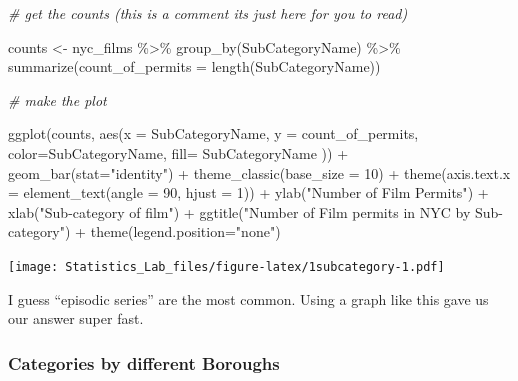 \documentclass[
]{book}
\newenvironment{Shaded}{\begin{snugshade}}{\end{snugshade}}
\newcommand{\AttributeTok}[1]{\textcolor[rgb]{0.77,0.63,0.00}{#1}}
\newcommand{\CommentTok}[1]{\textcolor[rgb]{0.56,0.35,0.01}{\textit{#1}}}
\newcommand{\DecValTok}[1]{\textcolor[rgb]{0.00,0.00,0.81}{#1}}
\newcommand{\FunctionTok}[1]{\textcolor[rgb]{0.00,0.00,0.00}{#1}}
\newcommand{\NormalTok}[1]{#1}
\newcommand{\OtherTok}[1]{\textcolor[rgb]{0.56,0.35,0.01}{#1}}
\newcommand{\SpecialCharTok}[1]{\textcolor[rgb]{0.00,0.00,0.00}{#1}}
\newcommand{\StringTok}[1]{\textcolor[rgb]{0.31,0.60,0.02}{#1}}
\begin{document}
\begin{Shaded}
\begin{Highlighting}[]
\CommentTok{\# get the counts (this is a comment it\textquotesingle{}s just here for you to read)}

\NormalTok{counts }\OtherTok{\textless{}{-}}\NormalTok{ nyc\_films }\SpecialCharTok{\%\textgreater{}\%}
          \FunctionTok{group\_by}\NormalTok{(SubCategoryName) }\SpecialCharTok{\%\textgreater{}\%}
          \FunctionTok{summarize}\NormalTok{(}\AttributeTok{count\_of\_permits =} \FunctionTok{length}\NormalTok{(SubCategoryName))}

\CommentTok{\# make the plot}

\FunctionTok{ggplot}\NormalTok{(counts, }\FunctionTok{aes}\NormalTok{(}\AttributeTok{x =}\NormalTok{ SubCategoryName, }\AttributeTok{y =}\NormalTok{ count\_of\_permits, }
                   \AttributeTok{color=}\NormalTok{SubCategoryName, }
                   \AttributeTok{fill=}\NormalTok{ SubCategoryName )) }\SpecialCharTok{+}
  \FunctionTok{geom\_bar}\NormalTok{(}\AttributeTok{stat=}\StringTok{"identity"}\NormalTok{) }\SpecialCharTok{+} 
  \FunctionTok{theme\_classic}\NormalTok{(}\AttributeTok{base\_size =} \DecValTok{10}\NormalTok{) }\SpecialCharTok{+}
  \FunctionTok{theme}\NormalTok{(}\AttributeTok{axis.text.x =} \FunctionTok{element\_text}\NormalTok{(}\AttributeTok{angle =} \DecValTok{90}\NormalTok{, }\AttributeTok{hjust =} \DecValTok{1}\NormalTok{)) }\SpecialCharTok{+}
  \FunctionTok{ylab}\NormalTok{(}\StringTok{"Number of Film Permits"}\NormalTok{) }\SpecialCharTok{+} 
  \FunctionTok{xlab}\NormalTok{(}\StringTok{"Sub{-}category of film"}\NormalTok{) }\SpecialCharTok{+}
  \FunctionTok{ggtitle}\NormalTok{(}\StringTok{"Number of Film permits in NYC by Sub{-}category"}\NormalTok{) }\SpecialCharTok{+}
  \FunctionTok{theme}\NormalTok{(}\AttributeTok{legend.position=}\StringTok{"none"}\NormalTok{) }
\end{Highlighting}
\end{Shaded}

\texttt{[image: Statistics\_Lab\_files/figure-latex/1subcategory-1.pdf]}

I guess ``episodic series'' are the most common. Using a graph like this gave us our answer super fast.

\hypertarget{categories-by-different-boroughs}{%
\subsubsection{Categories by different Boroughs}\label{categories-by-different-boroughs}}
\end{document}
